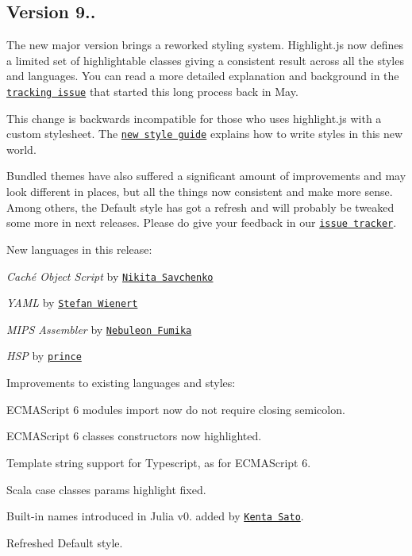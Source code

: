 \subsection*{Version 9..}

The new major version brings a reworked styling system. Highlight.\+js now defines a limited set of highlightable classes giving a consistent result across all the styles and languages. You can read a more detailed explanation and background in the \href{https://github.com/isagalaev/highlight.js/issues/348}{\tt tracking issue} that started this long process back in May.

This change is backwards incompatible for those who uses highlight.\+js with a custom stylesheet. The \href{http://highlightjs.readthedocs.org/en/latest/style-guide.html}{\tt new style guide} explains how to write styles in this new world.

Bundled themes have also suffered a significant amount of improvements and may look different in places, but all the things now consistent and make more sense. Among others, the Default style has got a refresh and will probably be tweaked some more in next releases. Please do give your feedback in our \href{https://github.com/isagalaev/highlight.js/issues}{\tt issue tracker}.

New languages in this release\+:


\begin{DoxyItemize}
\item {\itshape Caché Object Script} by \href{https://github.com/ZitRos}{\tt Nikita Savchenko}
\item {\itshape Y\+A\+ML} by \href{https://github.com/zealot128}{\tt Stefan Wienert}
\item {\itshape M\+I\+PS Assembler} by \href{https://github.com/Nebuleon}{\tt Nebuleon Fumika}
\item {\itshape H\+SP} by \href{https://github.com/prince-0203}{\tt prince}
\end{DoxyItemize}

Improvements to existing languages and styles\+:


\begin{DoxyItemize}
\item E\+C\+M\+A\+Script 6 modules import now do not require closing semicolon.
\item E\+C\+M\+A\+Script 6 classes constructors now highlighted.
\item Template string support for Typescript, as for E\+C\+M\+A\+Script 6.
\item Scala case classes params highlight fixed.
\item Built-\/in names introduced in Julia v0. added by \href{https://github.com/bicycle1885}{\tt Kenta Sato}.
\item Refreshed Default style.
\end{DoxyItemize}

